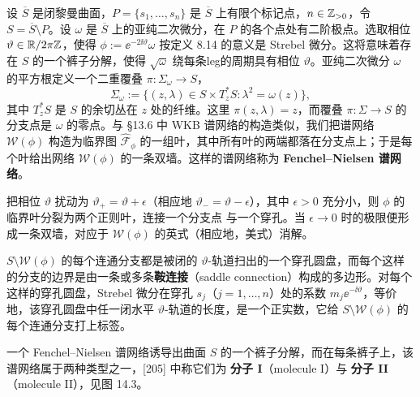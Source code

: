 设 $\overline{S}$ 是闭黎曼曲面，$P=\{s_1,\dots,s_n\}$ 是 $\overline{S}$ 上有限个标记点，$n\in\mathbb{Z}_{>0}$，令 $S=\overline{S}\setminus P$。设 $\omega$ 是 $\overline{S}$ 上的亚纯二次微分，在 $P$ 的各个点处有二阶极点。选取相位 $\vartheta\in\mathbb{R}/2\pi\mathbb{Z}$，使得 $\phi:=\ee^{-2\ii\vartheta}\omega$ 按定义 8.14 的意义是 Strebel 微分。这将意味着存在 $S$ 的一个裤子分解，使得 $\sqrt{\omega}$ 绕每条leg的周期具有相位 $\vartheta$。亚纯二次微分 $\omega$ 的平方根定义一个二重覆叠 $\pi\colon\Sigma_\omega\to S$，
\[
\Sigma_\omega:=\{(z,\lambda)\in S\times T_z^\ast S:\lambda^2=\omega(z)\} ,
\]
其中 $T_z^\ast S$ 是 $S$ 的余切丛在 $z$ 处的纤维。这里 $\pi(z,\lambda)=z$，而覆叠 $\pi\colon\Sigma\to S$ 的分支点是 $\omega$ 的零点。与 §13.6 中 WKB 谱网络的构造类似，我们把谱网络 $\mathcal{W}(\phi)$ 构造为临界图 $\hat{\mathcal{F}}_\phi$ 的一组叶，其中所有叶的两端都落在分支点上；于是每个叶给出网络 $\mathcal{W}(\phi)$ 的一条双墙。这样的谱网络称为 \textbf{Fenchel–Nielsen 谱网络}。

\begin{remark}[14.2]
把相位 $\vartheta$ 扰动为 $\vartheta_+=\vartheta+\epsilon$（相应地 $\vartheta_-=\vartheta-\epsilon$），其中 $\epsilon>0$ 充分小，则 $\phi$ 的临界叶分裂为两个正则叶，连接一个分支点%
与一个穿孔。当 $\epsilon\to0$ 时的极限便形成一条双墙，对应于 $\mathcal{W}(\phi)$ 的英式（相应地，美式）消解。
\end{remark}

$S\setminus\mathcal{W}(\phi)$ 的每个连通分支都是被闭的 $\vartheta$-轨道扫出的一个穿孔圆盘，而每个这样的分支的边界是由一条或多条\textbf{鞍连接}（saddle connection）构成的多边形。对每个这样的穿孔圆盘，Strebel 微分在穿孔 $s_j$（$j=1,\dots,n$）处的系数 $m_j\ee^{-\ii\vartheta}$，等价地，该穿孔圆盘中任一闭水平 $\vartheta$-轨道的长度，是一个正实数，它给 $S\setminus\mathcal{W}(\phi)$ 的每个连通分支打上标签。

一个 Fenchel–Nielsen 谱网络诱导出曲面 $S$ 的一个裤子分解，而在每条裤子上，该谱网络属于两种类型之一，[205] 中称它们为 \textbf{分子 I}（molecule I）与 \textbf{分子 II}（molecule II），见图 14.3。


